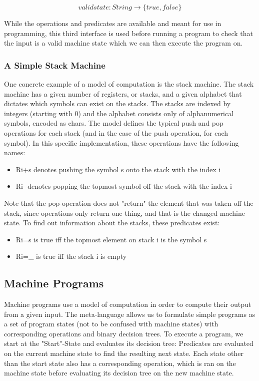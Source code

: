 \documentclass[12pt, a4paper]{article}
\begin{document}
\[validstate \colon String \rightarrow \{true, false\}\]

While the operations and predicates are available and meant for use in programming, this third interface is used before running a program to check that the input is a valid machine state which we can then execute the program on.

\subsubsection{A Simple Stack Machine}

One concrete example of a model of computation is the stack machine. The stack machine has a given number of registers, or stacks, and a given alphabet that dictates which symbols can exist on the stacks. The stacks are indexed by integers (starting with 0) and the alphabet consists only of alphanumerical symbols, encoded as chars. The model defines the typical push and pop operations for each stack (and in the case of the push operation, for each symbol). In this specific implementation, these operations have the following names:

\begin{itemize}
    \item Ri+s denotes pushing the symbol s onto the stack with the index i
    \item Ri- denotes popping the topmost symbol off the stack with the index i
\end{itemize}

Note that the pop-operation does not "return" the element that was taken off the stack, since operations only return one thing, and that is the changed machine state. To find out information about the stacks, these predicates exist:

\begin{itemize}
    \item Ri=s is true iff the topmost element on stack i is the symbol s
    \item Ri=\_ is true iff the stack i is empty
\end{itemize}

\subsection{Machine Programs}
Machine programs use a model of computation in order to compute their output from a given input. The meta-language %
allows us to formulate simple programs as a set of program states (not to be confused with machine states) with corresponding operations and binary decision trees. To execute a program, we start at the "Start"-State and evaluates its decision tree: Predicates are evaluated on the current machine state to find the resulting next state. Each state other than the start state also has a corresponding operation, which is ran on the machine state before evaluating its decision tree on the new machine state.
\end{document}
